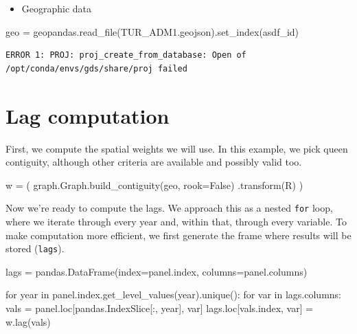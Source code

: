 \documentclass[
  letterpaper,
  DIV=11,
  numbers=noendperiod]{scrreprt}
\newenvironment{Shaded}{\begin{snugshade}}{\end{snugshade}}
\newcommand{\ControlFlowTok}[1]{\textcolor[rgb]{0.00,0.23,0.31}{#1}}
\newcommand{\KeywordTok}[1]{\textcolor[rgb]{0.00,0.23,0.31}{#1}}
\newcommand{\NormalTok}[1]{\textcolor[rgb]{0.00,0.23,0.31}{#1}}
\newcommand{\OperatorTok}[1]{\textcolor[rgb]{0.37,0.37,0.37}{#1}}
\newcommand{\StringTok}[1]{\textcolor[rgb]{0.13,0.47,0.30}{#1}}
\newcommand{\VariableTok}[1]{\textcolor[rgb]{0.07,0.07,0.07}{#1}}
\providecommand{\tightlist}{%
  \setlength{\itemsep}{0pt}\setlength{\parskip}{0pt}}\usepackage{longtable,booktabs,array}
\begin{document}
\begin{itemize}
\tightlist
\item
  Geographic data
\end{itemize}

\begin{Shaded}
\begin{Highlighting}[]
\NormalTok{geo }\OperatorTok{=}\NormalTok{ geopandas.read\_file(}\StringTok{\textquotesingle{}TUR\_ADM1.geojson\textquotesingle{}}\NormalTok{).set\_index(}\StringTok{\textquotesingle{}asdf\_id\textquotesingle{}}\NormalTok{)}
\end{Highlighting}
\end{Shaded}

\begin{verbatim}
ERROR 1: PROJ: proj_create_from_database: Open of /opt/conda/envs/gds/share/proj failed
\end{verbatim}

\section{Lag computation}\label{lag-computation}

First, we compute the spatial weights we will use. In this example, we
pick queen contiguity, although other criteria are available and
possibly valid too.

\begin{Shaded}
\begin{Highlighting}[]
\NormalTok{w }\OperatorTok{=}\NormalTok{ (}
\NormalTok{    graph.Graph.build\_contiguity(geo, rook}\OperatorTok{=}\VariableTok{False}\NormalTok{)}
\NormalTok{    .transform(}\StringTok{\textquotesingle{}R\textquotesingle{}}\NormalTok{)}
\NormalTok{)}
\end{Highlighting}
\end{Shaded}

Now we're ready to compute the lags. We approach this as a nested
\texttt{for} loop, where we iterate through every year and, within that,
through every variable. To make computation more efficient, we first
generate the frame where results will be stored (\texttt{lags}).

\begin{Shaded}
\begin{Highlighting}[]
\NormalTok{lags }\OperatorTok{=}\NormalTok{ pandas.DataFrame(index}\OperatorTok{=}\NormalTok{panel.index, columns}\OperatorTok{=}\NormalTok{panel.columns)}

\ControlFlowTok{for}\NormalTok{ year }\KeywordTok{in}\NormalTok{ panel.index.get\_level\_values(}\StringTok{\textquotesingle{}year\textquotesingle{}}\NormalTok{).unique():}
    \ControlFlowTok{for}\NormalTok{ var }\KeywordTok{in}\NormalTok{ lags.columns:}
\NormalTok{        vals }\OperatorTok{=}\NormalTok{ panel.loc[pandas.IndexSlice[:, year], var]}
\NormalTok{        lags.loc[vals.index, var] }\OperatorTok{=}\NormalTok{ w.lag(vals)}
\end{Highlighting}
\end{Shaded}
\end{document}
